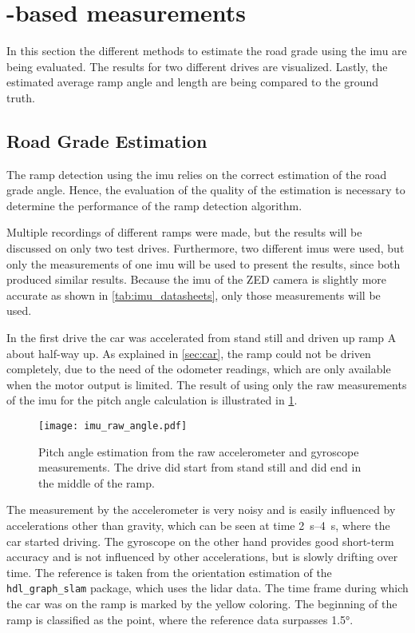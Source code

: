 \section{-based measurements}
\label{sec:eval_imu}
In this section the different methods to estimate the road grade using the \gls{imu} are being evaluated.
The results for two different drives are visualized.
Lastly, the estimated average ramp angle and length are being compared to the ground truth.

\subsection{Road Grade Estimation}
The ramp detection using the \gls{imu} relies on the correct estimation of the road grade angle.
Hence, the evaluation of the quality of the estimation is necessary to determine the performance of the ramp detection algorithm.

Multiple recordings of different ramps were made, but the results will be discussed on only two test drives.
Furthermore, two different \glspl{imu} were used, but only the measurements of one \gls{imu} will be used to present the results, since both produced similar results.
Because the \gls{imu} of the ZED camera is slightly more accurate as shown in \cref{tab:imu_datasheets}, only those measurements will be used.

In the first drive the car was accelerated from stand still and driven up ramp A about half-way up.
As explained in \cref{sec:car}, the ramp could not be driven completely, due to the need of the odometer readings, which are only available when the motor output is limited.
The result of using only the raw measurements of the \gls{imu} for the pitch angle calculation is illustrated in \cref{fig:imu_raw_angle}.
\begin{figure}[b!]
    \centering
    \texttt{[image: imu\_raw\_angle.pdf]}
    \caption[ angle estimation using raw measurements]{Pitch angle estimation from the raw accelerometer and gyroscope measurements. The drive did start from stand still and did end in the middle of the ramp.}
    \label{fig:imu_raw_angle}
\end{figure}
The measurement by the accelerometer is very noisy and is easily influenced by accelerations other than gravity, which can be seen at time \SIrange{2}{4}{\second}, where the car started driving.
The gyroscope on the other hand provides good short-term accuracy and is not influenced by other accelerations, but is slowly drifting over time.
The reference is taken from the orientation estimation of the \texttt{hdl\_graph\_slam} package, which uses the \gls{lidar} data.
The time frame during which the car was on the ramp is marked by the yellow coloring.
The beginning of the ramp is classified as the point, where the reference data surpasses \ang{1.5}.

